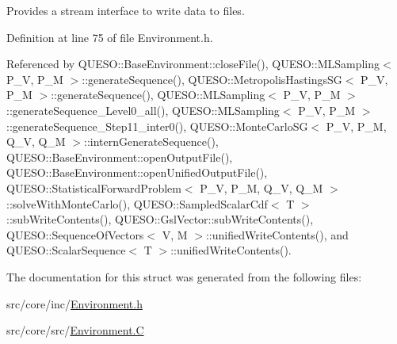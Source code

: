 Provides a stream interface to write data to files. 



Definition at line 75 of file Environment.\-h.



Referenced by Q\-U\-E\-S\-O\-::\-Base\-Environment\-::close\-File(), Q\-U\-E\-S\-O\-::\-M\-L\-Sampling$<$ P\-\_\-\-V, P\-\_\-\-M $>$\-::generate\-Sequence(), Q\-U\-E\-S\-O\-::\-Metropolis\-Hastings\-S\-G$<$ P\-\_\-\-V, P\-\_\-\-M $>$\-::generate\-Sequence(), Q\-U\-E\-S\-O\-::\-M\-L\-Sampling$<$ P\-\_\-\-V, P\-\_\-\-M $>$\-::generate\-Sequence\-\_\-\-Level0\-\_\-all(), Q\-U\-E\-S\-O\-::\-M\-L\-Sampling$<$ P\-\_\-\-V, P\-\_\-\-M $>$\-::generate\-Sequence\-\_\-\-Step11\-\_\-inter0(), Q\-U\-E\-S\-O\-::\-Monte\-Carlo\-S\-G$<$ P\-\_\-\-V, P\-\_\-\-M, Q\-\_\-\-V, Q\-\_\-\-M $>$\-::intern\-Generate\-Sequence(), Q\-U\-E\-S\-O\-::\-Base\-Environment\-::open\-Output\-File(), Q\-U\-E\-S\-O\-::\-Base\-Environment\-::open\-Unified\-Output\-File(), Q\-U\-E\-S\-O\-::\-Statistical\-Forward\-Problem$<$ P\-\_\-\-V, P\-\_\-\-M, Q\-\_\-\-V, Q\-\_\-\-M $>$\-::solve\-With\-Monte\-Carlo(), Q\-U\-E\-S\-O\-::\-Sampled\-Scalar\-Cdf$<$ T $>$\-::sub\-Write\-Contents(), Q\-U\-E\-S\-O\-::\-Gsl\-Vector\-::sub\-Write\-Contents(), Q\-U\-E\-S\-O\-::\-Sequence\-Of\-Vectors$<$ V, M $>$\-::unified\-Write\-Contents(), and Q\-U\-E\-S\-O\-::\-Scalar\-Sequence$<$ T $>$\-::unified\-Write\-Contents().



The documentation for this struct was generated from the following files\-:\begin{DoxyCompactItemize}
\item 
src/core/inc/\hyperlink{_environment_8h}{Environment.\-h}\item 
src/core/src/\hyperlink{_environment_8_c}{Environment.\-C}\end{DoxyCompactItemize}
